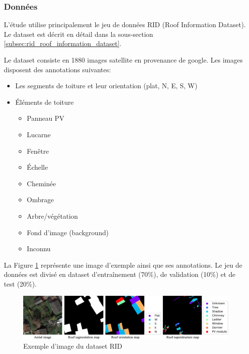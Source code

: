 {{{{\subsubsection{Données}
\par{L'étude utilise principalement le jeu de données RID (Roof Information Dataset). Le dataset est décrit en détail dans la sous-section \ref{subsec:rid_roof_information_dataset}.}
\par{Le dataset consiste en 1880 images satellite en provenance de google. Les images disposent des annotations suivantes:
\begin{itemize}
    \item Les segments de toiture et leur orientation (plat, N, E, S, W)
    \item Éléments de toiture
    \begin{itemize}
        \item Panneau PV
        \item Lucarne
        \item Fenêtre
        \item Échelle
        \item Cheminée
        \item Ombrage
        \item Arbre/végétation
        \item Fond d'image (background)
        \item Inconnu
    \end{itemize}
\end{itemize}}
\par{La Figure \ref{fig:rid_dataset_sample} représente une image d'exemple ainsi que ses annotations. Le jeu de données est divisé en dataset d'entraînement (70\%), de validation (10\%) et de test (20\%).}
\begin{figure}[H]
    \centering
        \includegraphics[width=1\linewidth]{02-main//figures/rid_dataset_sample.png}
    \caption{Exemple d'image du dataset RID \cite{li_deep_2024}}
    \label{fig:rid_dataset_sample}
\end{figure}

}}}}
